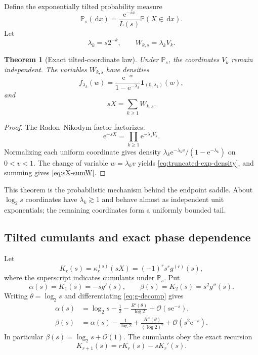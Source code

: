 \documentclass[11pt,oneside]{article}
\newtheorem{theorem}{Theorem}[section]
\theoremstyle{definition}
\theoremstyle{remark}
\newcommand{\e}{\mathrm e}
\newcommand{\dd}{\,\mathrm d}
\newcommand{\Prob}{\mathbb P}
\newcommand{\bigO}{\mathcal O}
\begin{document}
Define the exponentially tilted probability measure
\begin{equation}\label{eq:tilt-def}
 \Prob_s(\dd x)=\frac{\e^{-sx}}{L(s)}\Prob(X\in\dd x).
\end{equation}
Let
\begin{equation}\label{eq:lambda-W}
 \lambda_k=s2^{-k},\qquad W_{k,s}=\lambda_kV_k.
\end{equation}

\begin{theorem}[Exact tilted-coordinate law]\label{thm:tilted-coordinates}
Under $\Prob_s$, the coordinates $V_k$ remain independent.  The variables
$W_{k,s}$ have densities
\begin{equation}\label{eq:truncated-exp-density}
 f_{\lambda_k}(w)=
 \frac{\e^{-w}}{1-\e^{-\lambda_k}}
 \bm1_{(0,\lambda_k)}(w),
\end{equation}
and
\begin{equation}\label{eq:sX-sumW}
 sX=\sum_{k\ge1}W_{k,s}.
\end{equation}
\end{theorem}

\begin{proof}
The Radon--Nikodym factor factorizes:
\[
 \e^{-sX}=\prod_{k\ge1}\e^{-\lambda_kV_k}.
\]
Normalizing each uniform coordinate gives density
$\lambda_k\e^{-\lambda_kv}/(1-\e^{-\lambda_k})$ on $0<v<1$.
The change of variable $w=\lambda_kv$ yields
\cref{eq:truncated-exp-density}, and summing gives \cref{eq:sX-sumW}.
\end{proof}

This theorem is the probabilistic mechanism behind the endpoint saddle.  About
$\log_2s$ coordinates have $\lambda_k\gtrsim1$ and behave almost as independent
unit exponentials; the remaining coordinates form a uniformly bounded tail.

\subsection{Tilted cumulants and exact phase dependence}

Let
\begin{equation}\label{eq:K-r-def}
 K_r(s)=\kappa_r^{(s)}(sX)=(-1)^rs^rg^{(r)}(s),
\end{equation}
where the superscript indicates cumulants under $\Prob_s$.  Put
\begin{equation}\label{eq:alpha-beta}
 \alpha(s)=K_1(s)=-sg'(s),\qquad
 \beta(s)=K_2(s)=s^2g''(s).
\end{equation}
Writing $\theta=\log_2s$ and differentiating \cref{eq:g-decomp} gives
\begin{align}
 \alpha(s)&=\log_2s-\frac12-
 \frac{R'(\theta)}{\log2}+\bigO(s\e^{-s}),
 \label{eq:alpha-asymp}\\
 \beta(s)&=\alpha(s)-\frac1{\log2}
 +\frac{R''(\theta)}{(\log2)^2}+\bigO(s^2\e^{-s}).
 \label{eq:beta-asymp}
\end{align}
In particular $\beta(s)=\log_2s+\bigO(1)$.  The cumulants obey the exact
recursion
\begin{equation}\label{eq:K-recur}
 K_{r+1}(s)=rK_r(s)-sK_r'(s).
\end{equation}
\end{document}
